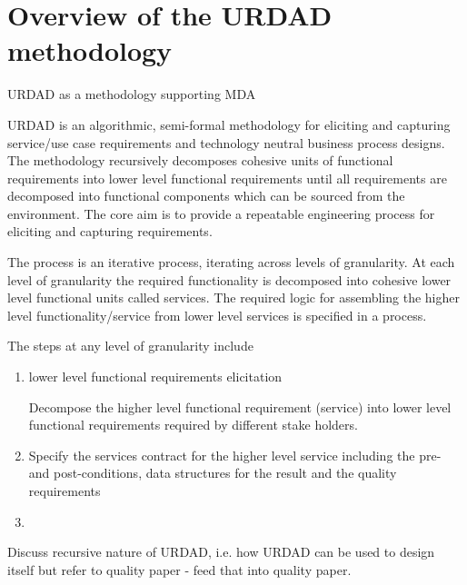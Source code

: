 \section{Overview of the URDAD methodology \label{sec:urdadMethodology}}

URDAD as a methodology supporting MDA

URDAD is an algorithmic, semi-formal methodology for eliciting and capturing service/use case requirements and technology neutral business process designs\cite{solms_urdad_2010}. The methodology recursively decomposes cohesive units of functional requirements into lower level functional requirements until all requirements are decomposed into functional components which can be sourced from the environment. The core aim is to provide a repeatable engineering process for eliciting and capturing requirements. 

The process is an iterative process, iterating across levels of granularity. At each level of granularity the required functionality is decomposed into cohesive lower level functional units called services. The required logic for assembling the higher level functionality/service from lower level services is specified in a process.

The steps at any level of granularity include
\begin{enumerate}
 \item lower level {functional requirements elicitation}
 
Decompose the higher level functional requirement (service) into lower level functional requirements required by different stake holders.
 \item Specify the services contract for the higher level service including the pre- and post-conditions, data structures for the result and the quality requirements
 \item 
\end{enumerate}

Discuss recursive nature of URDAD, i.e. how URDAD can be used to design itself but refer to quality paper - feed that into quality paper.


